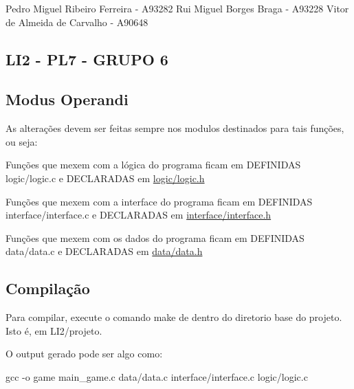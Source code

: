 Pedro Miguel Ribeiro Ferreira -\/ A93282 Rui Miguel Borges Braga -\/ A93228 Vitor de Almeida de Carvalho -\/ A90648

\subsection*{L\+I2 -\/ P\+L7 -\/ G\+R\+U\+PO 6 }

\subsection*{Modus Operandi }

As alterações devem ser feitas sempre nos modulos destinados para tais funções, ou seja\+:

Funções que mexem com a lógica do programa ficam em D\+E\+F\+I\+N\+I\+D\+AS logic/logic.\+c e D\+E\+C\+L\+A\+R\+A\+D\+AS em \hyperlink{logic_8h}{logic/logic.\+h}

Funções que mexem com a interface do programa ficam em D\+E\+F\+I\+N\+I\+D\+AS interface/interface.\+c e D\+E\+C\+L\+A\+R\+A\+D\+AS em \hyperlink{interface_8h}{interface/interface.\+h}

Funções que mexem com os dados do programa ficam em D\+E\+F\+I\+N\+I\+D\+AS data/data.\+c e D\+E\+C\+L\+A\+R\+A\+D\+AS em \hyperlink{data_8h}{data/data.\+h}

\subsection*{Compilação }

Para compilar, execute o comando \textquotesingle{}make\textquotesingle{} de dentro do diretorio base do projeto. Isto é, em L\+I2/projeto.

O output gerado pode ser algo como\+: 
\begin{DoxyCode}
gcc -o game main\_game.c data/data.c interface/interface.c logic/logic.c
\end{DoxyCode}
 